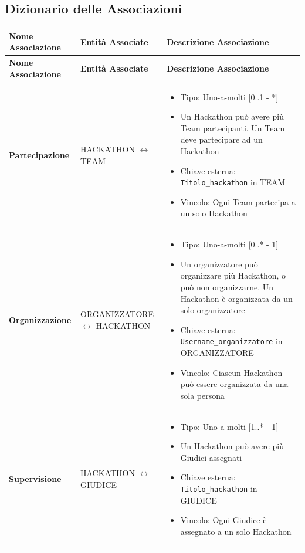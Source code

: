 \documentclass[a4paper, 11pt]{article}
\renewcommand{\arraystretch}{1.2} %
\begin{document}
	\subsection{Dizionario delle Associazioni}
	{\footnotesize
		\setlength{\arrayrulewidth}{0.5pt}
		\renewcommand{\arraystretch}{1.5}
		\begin{longtable}{
				>{\raggedright\arraybackslash}p{4cm} %
				>{\centering\arraybackslash}p{4cm}    %
				>{\raggedright\arraybackslash}p{6.5cm}%
			}
			\hline
			\textbf{Nome Associazione} & \textbf{Entità Associate} & \textbf{Descrizione Associazione} \\
			\hline
			\endfirsthead
			\hline
			\textbf{Nome Associazione} & \textbf{Entità Associate} & \textbf{Descrizione Associazione} \\
			\hline
			\endhead
			\hline
			\endfoot
			\hline
			\endlastfoot
			
			\textbf{Partecipazione}  & 
			HACKATHON $\leftrightarrow$ TEAM &
			\begin{itemize}
				\item Tipo: Uno-a-molti [0..1 - *]
				\item Un Hackathon può avere più Team partecipanti. Un Team deve partecipare ad un Hackathon
				\item Chiave esterna: \texttt{Titolo\_hackathon} in TEAM
				\item Vincolo: Ogni Team partecipa a un solo Hackathon
			\end{itemize} \\
			\hline
			
			\textbf{Organizzazione} & 
			ORGANIZZATORE $\leftrightarrow$ HACKATHON &
			\begin{itemize}
				\item Tipo: Uno-a-molti [0..* - 1]
				\item Un organizzatore può organizzare più Hackathon, o può non organizzarne. Un Hackathon è organizzata da un solo organizzatore
				\item Chiave esterna: \texttt{Username\_organizzatore} in ORGANIZZATORE
				\item Vincolo: Ciascun Hackathon può essere organizzata da una sola persona
			\end{itemize} \\
			\hline
			
			\textbf{Supervisione} & 
			HACKATHON $\leftrightarrow$ GIUDICE &
			\begin{itemize}
				\item Tipo: Uno-a-molti [1..* - 1]
				\item Un Hackathon può avere più Giudici assegnati
				\item Chiave esterna: \texttt{Titolo\_hackathon} in GIUDICE
				\item Vincolo: Ogni Giudice è assegnato a un solo Hackathon
			\end{itemize} \\
			\hline
			

\end{longtable}}
\end{document}
